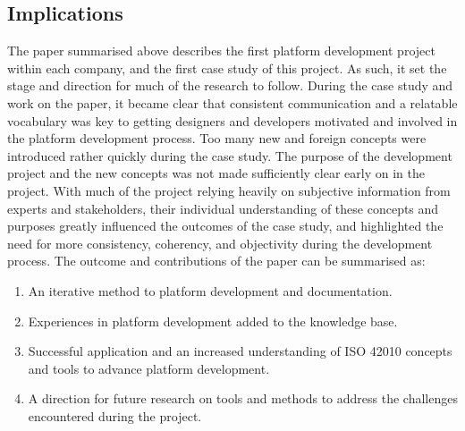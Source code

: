 \subsection{Implications}
The paper summarised above describes the first platform development project within each company, and the first case study of this \PhD{} project. 
As such, it set the stage and direction for much of the research to follow.
During the case study and work on the paper, it became clear that consistent communication and a relatable vocabulary was key to getting designers and developers motivated and involved in the platform development process.
Too many new and foreign concepts were introduced rather quickly during the case study.
The purpose of the development project and the new concepts was not made sufficiently clear early on in the project.
With much of the project relying heavily on subjective information from experts and stakeholders, their individual understanding of these concepts and purposes greatly influenced the outcomes of the case study, and highlighted the need for more consistency, coherency, and objectivity during the development process.
The outcome and contributions of the paper can be summarised as:
\begin{enumerate}
  \item An iterative method to platform development and documentation.
  \item Experiences in platform development added to the knowledge base.
  \item Successful application and an increased understanding of ISO 42010 concepts and tools to advance platform development.
  \item A direction for future research on tools and methods to address the challenges encountered during the project.
\end{enumerate}